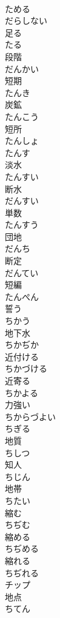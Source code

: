 \documentclass[8pt]{extreport}
\begin{document}
\begin{CJK}{UTF8}{min}
\\	ためる	
\\	だらしない	
\\	足る 
\\	たる	
\\	段階 
\\	だんかい	
\\	短期 
\\	たんき	
\\	炭鉱 
\\	たんこう	
\\	短所 
\\	たんしょ	
\\	たんす	
\\	淡水 
\\	たんすい	
\\	断水 
\\	だんすい	
\\	単数 
\\	たんすう	
\\	団地 
\\	だんち	
\\	断定 
\\	だんてい	
\\	短編 
\\	たんぺん	
\\	誓う 
\\	ちかう	
\\	地下水 
\\	ちかぢか	
\\	近付ける 
\\	ちかづける	
\\	近寄る 
\\	ちかよる	
\\	力強い 
\\	ちからづよい	
\\	ちぎる	
\\	地質 
\\	ちしつ	
\\	知人 
\\	ちじん	
\\	地帯 
\\	ちたい	
\\	縮む 
\\	ちぢむ	
\\	縮める 
\\	ちぢめる	
\\	縮れる 
\\	ちぢれる	
\\	チップ	
\\	地点 
\\	ちてん	

\end{CJK}
\end{document}
